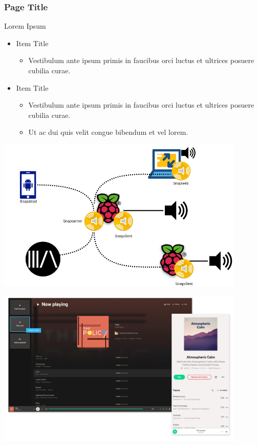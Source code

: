 \documentclass[a4paper]{beamer}
\begin{document}
\begin{frame}
    \frametitle{Page Title}
    Lorem Ipsum
    \begin{itemize}
        \item Item Title
            \begin{itemize}
                \item Vestibulum ante ipsum primis in faucibus orci luctus et ultrices posuere cubilia curae.
            \end{itemize}
        \item Item Title
            \begin{itemize}
                \item Vestibulum ante ipsum primis in faucibus orci luctus et ultrices posuere cubilia curae.
                \item Ut ac dui quis velit congue bibendum et vel lorem.
            \end{itemize}
    \end{itemize}
    \begin{minipage}[b]{.45\linewidth}
        \centering
        \includegraphics[width=0.89\textwidth]{images/snapcast_client.png}
    \end{minipage}
    \begin{minipage}[b]{.45\linewidth}
        \centering
        \includegraphics[width=0.89\textwidth]{images/user_interface.png}
    \end{minipage}
\end{frame}


\begin{frame}
    \maketitle
\end{frame}
\end{document}
